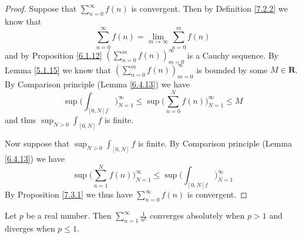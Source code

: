 \begin{proof}
    Suppose that \(\sum_{n = 0}^\infty f(n)\) is convergent.
    Then by Definition \ref{7.2.2} we know that
    \[
        \sum_{n = 0}^\infty f(n) = \lim_{m \to \infty} \sum_{n = 0}^m f(n)
    \]
    and by Proposition \ref{6.1.12} \((\sum_{n = 0}^m f(n))_{m = 0}^\infty\) is a Cauchy sequence.
    By Lemma \ref{5.1.15} we know that \((\sum_{n = 0}^m f(n))_{m = 0}^\infty\) is bounded by some \(M \in \mathbf{R}\).
    By Comparison principle (Lemma \ref{6.4.13}) we have
    \[
        \sup \bigg(\int_{[0, N] f}\bigg)_{N = 1}^\infty \leq \sup \bigg(\sum_{n = 0}^N f(n)\bigg)_{N = 1}^\infty \leq M
    \]
    and thus \(\sup_{N > 0} \int_{[0, N]} f\) is finite.

    Now suppose that \(\sup_{N > 0} \int_{[0, N]} f\) is finite.
    By Comparison principle (Lemma \ref{6.4.13}) we have
    \[
        \sup \bigg(\sum_{n = 1}^N f(n)\bigg)_{N = 1}^\infty \leq \sup \bigg(\int_{[0, N] f}\bigg)_{N = 1}^\infty
    \]
    By Proposition \ref{7.3.1} we thus have \(\sum_{n = 0}^\infty f(n)\) is convergent.
\end{proof}

\begin{corollary}\label{11.6.5}
    Let \(p\) be a real number.
    Then \(\sum_{n = 1}^\infty \frac{1}{n^p}\) converges absolutely when \(p > 1\) and diverges when \(p \leq 1\).
\end{corollary}

